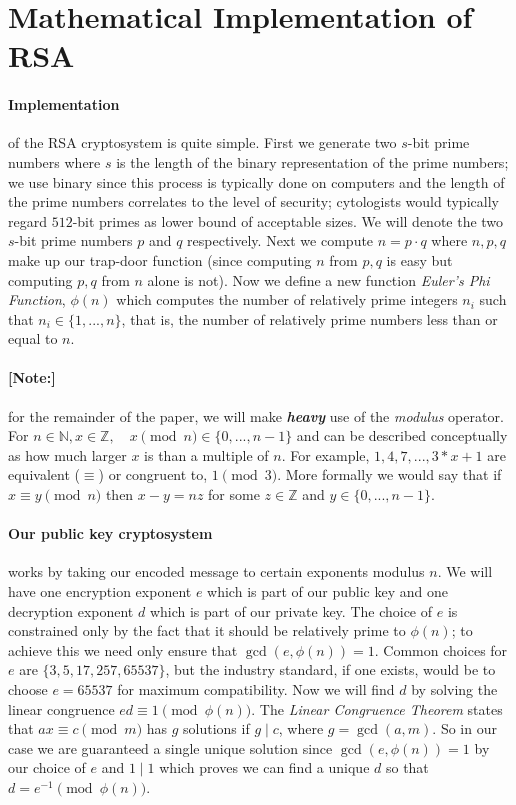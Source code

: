 \documentclass[12pt]{article}
\newcommand{\Z}{\mathbb{Z}}
\newcommand{\N}{\mathbb{N}}
\theoremstyle{remark}
\begin{document}
\section{Mathematical Implementation of RSA}

\paragraph{Implementation} of the RSA cryptosystem is quite simple.  First we generate two $s$-bit prime numbers where $s$ is the length of the binary representation of the prime numbers; we use binary since this process is typically done on computers and the length of the prime numbers correlates to the level of security; cytologists would typically regard $512$-bit primes as lower bound of acceptable sizes.  We will denote the two $s$-bit prime numbers $p$ and $q$ respectively.  Next we compute $n = p\cdot q$ where $n,p,q$ make up our trap-door function (since computing $n$ from $p,q$ is easy but computing $p,q$ from $n$ alone is not).  Now we define a new function \textit{Euler's Phi Function}, $\phi(n)$ which computes the number of relatively prime integers $n_i$ such that $n_i\in\{1,...,n\}$, that is, the number of relatively prime numbers less than or equal to $n$.

\paragraph{[Note:]} for the remainder of the paper, we will make \textbf{\emph{heavy}} use of the \textit{modulus} operator.  For $n\in \N,x\in \Z ,\quad x\pmod{n}\in \{0,...,n-1\}$ and can be described conceptually as how much larger $x$ is than a multiple of $n$.  For example, $1,4,7,..., 3*x+1$ are equivalent ($\equiv$) or congruent to, $1\pmod{3}$.  More formally we would say that if $x\equiv y\pmod{n}$ then $x-y = nz$ for some $z\in\Z$ and $y\in \{0,...,n-1\}$.

\paragraph{Our public key cryptosystem} works by taking our encoded message to certain exponents modulus $n$.  We will have one encryption exponent $e$ which is part of our public key and one decryption exponent $d$ which is part of our private key.  The choice of $e$ is constrained only by the fact that it should be relatively prime to $\phi(n)$; to achieve this we need only ensure that $\gcd(e,\phi(n))=1$.  Common choices for $e$ are $\{3, 5, 17, 257, 65537\}$, but the industry standard, if one exists, would be to choose $e=65537$ for maximum compatibility.  Now we will find $d$ by solving the linear congruence $ed \equiv 1 \pmod{\phi(n)}$.  The \textit{Linear Congruence Theorem} states that $ax \equiv c \pmod{m}$ has $g$ solutions if $g \mid c$, where $g=\gcd(a,m)$.  So in our case we are guaranteed a single unique solution since $\gcd(e,\phi(n))=1$ by our choice of $e$ and $1\mid 1$ which proves we can find a unique $d$ so that $d=e^{-1}\pmod{\phi(n)}$.
\end{document}

